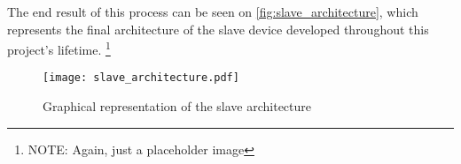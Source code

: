The end result of this process can be seen on \autoref{fig:slave_architecture}, which represents the final architecture of the slave device developed throughout this project's lifetime. \footnote{NOTE: Again, just a placeholder image}

\begin{figure}[t]
	\centering
	\texttt{[image: slave\_architecture.pdf]}
	\caption{Graphical representation of the slave architecture}
	\label{fig:slave_architecture}
\end{figure}
